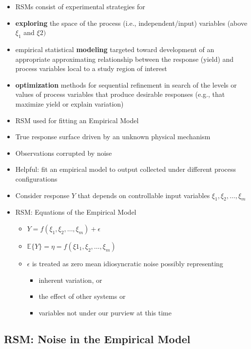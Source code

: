 \documentclass[
  letterpaper,
  DIV=11,
  numbers=noendperiod]{scrreprt}
\providecommand{\tightlist}{%
  \setlength{\itemsep}{0pt}\setlength{\parskip}{0pt}}\usepackage{longtable,booktabs,array}
\begin{document}
\begin{itemize}
\item
  RSMs consist of experimental strategies for
\item
  \textbf{exploring} the space of the process (i.e., independent/input)
  variables (above \(\xi_1\) and \(\xi2)\)
\item
  empirical statistical \textbf{modeling} targeted toward development of
  an appropriate approximating relationship between the response (yield)
  and process variables local to a study region of interest
\item
  \textbf{optimization} methods for sequential refinement in search of
  the levels or values of process variables that produce desirable
  responses (e.g., that maximize yield or explain variation)
\item
  RSM used for fitting an Empirical Model
\item
  True response surface driven by an unknown physical mechanism
\item
  Observations corrupted by noise
\item
  Helpful: fit an empirical model to output collected under different
  process configurations
\item
  Consider response \(Y\) that depends on controllable input variables
  \(\xi_1, \xi_2, \ldots, \xi_m\)
\item
  RSM: Equations of the Empirical Model

  \begin{itemize}
  \tightlist
  \item
    \(Y=f(\xi_1, \xi_2, \ldots, \xi_m) + \epsilon\)
  \item
    \(\mathbb{E}\{Y\} = \eta = f(\xi1_1, \xi_2, \ldots, \xi_m)\)
  \item
    \(\epsilon\) is treated as zero mean idiosyncratic noise possibly
    representing

    \begin{itemize}
    \tightlist
    \item
      inherent variation, or
    \item
      the effect of other systems or
    \item
      variables not under our purview at this time
    \end{itemize}
  \end{itemize}
\end{itemize}

\subsection{RSM: Noise in the Empirical
Model}\label{rsm-noise-in-the-empirical-model}
\end{document}
